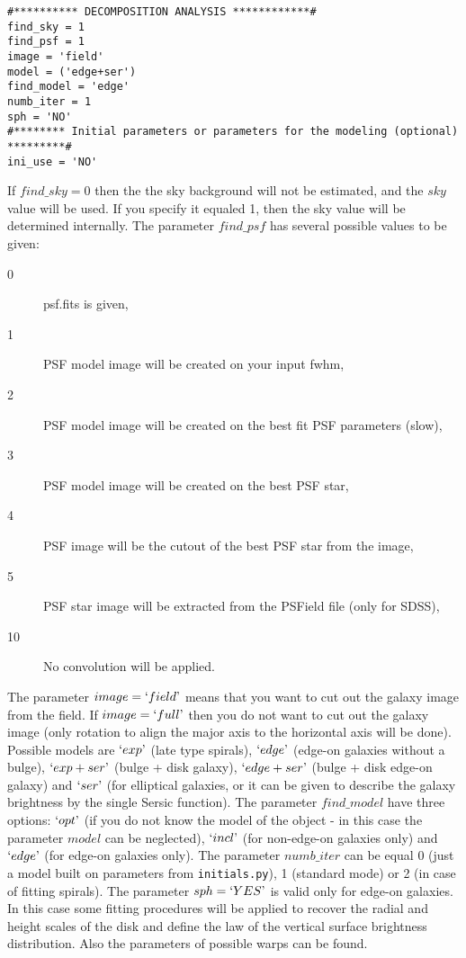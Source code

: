 \documentclass[
aps,%
12pt,%
final,%
notitlepage,%
oneside,%
onecolumn,%
nobibnotes,%
nofootinbib,%
superscriptaddress,%
noshowpacs,%
centertags]%
{revtex4}
\begin{document}
\begin{verbatim}
#********** DECOMPOSITION ANALYSIS ************#
find_sky = 1 
find_psf = 1 					
image = 'field' 				
model = ('edge+ser') 
find_model = 'edge'
numb_iter = 1 					
sph = 'NO'					
#******** Initial parameters or parameters for the modeling (optional) *********#
ini_use = 'NO'					
\end{verbatim}
If $find\_sky=0$ then the the sky background will not be estimated, and the $sky$ value will be used. If you specify it equaled 1, then the sky value will be determined internally. 
The parameter $find\_psf$ has several possible values to be given:
\begin{description}
\item[0] psf.fits is given,
\item[1] PSF model image will be created on your input fwhm,
\item[2] PSF model image will be created on the best fit PSF parameters (slow),
\item[3] PSF model image will be created on the best PSF star,
\item[4] PSF image will be the cutout of the best PSF star from the image,
\item[5] PSF star image will be extracted from the PSField file (only for SDSS),
\item[10] No convolution will be applied. 
\end{description}
The parameter $image=`field\textrm'$ means that you want to cut out the galaxy image from the field. If $image=`full\textrm'$ then you do not want to cut out the galaxy image (only rotation to align the major axis to the horizontal axis will be done).
Possible models are $`exp\textrm'$ (late type spirals), $`edge\textrm'$ (edge-on galaxies without a bulge), $`exp+ser\textrm'$ (bulge + disk galaxy), $`edge+ser\textrm'$ (bulge + disk edge-on galaxy) and $`ser\textrm'$ (for elliptical galaxies, or it can be given to describe the galaxy brightness by the single Sersic function). The parameter $find\_model$ have three options: $`opt\textrm'$ (if you do not know the model of the object - in this case the parameter $model$ can be neglected), $`incl\textrm'$ (for non-edge-on galaxies only) and $`edge\textrm'$ (for edge-on galaxies only). The parameter $numb\_iter$ can be equal 0 (just a model built on parameters from \texttt{initials.py}), 1 (standard mode) or 2 (in case of fitting spirals). The parameter $sph=`YES\textrm'$ is valid only for edge-on galaxies. In this case some fitting procedures will be applied to recover the radial and height scales of the disk and define the law of the vertical surface brightness distribution. Also the parameters of possible warps can be found.  
\end{document}
